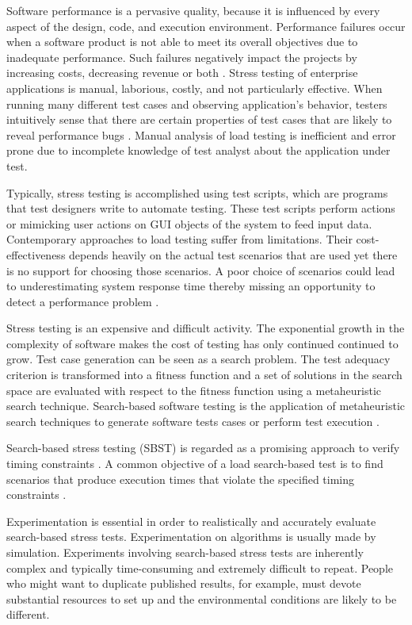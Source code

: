 \documentclass[espaco=umemeio,chapter=TITLE,twoside,openright]{abnt}
\begin{document}
Software performance is a pervasive quality,  because it is influenced by every aspect of the design, code, and execution environment. Performance failures occur when a software product is not able to meet its overall objectives due to inadequate performance. Such failures negatively impact the projects by increasing costs, decreasing revenue or both \cite{Vetoio2011}. Stress testing of enterprise applications is manual, laborious, costly, and not particularly effective. When running many different test cases and observing application’s behavior, testers intuitively sense that there are certain properties of test cases that are likely to reveal performance bugs \cite{Grechanik2012}. Manual analysis of load testing is inefficient and error prone due to incomplete knowledge of test analyst about the application under test\cite{Arslan2015}.

Typically, stress testing is accomplished using test scripts, which are programs that test designers write to automate testing. These test scripts perform actions or mimicking user actions on GUI objects of the system to feed input data. Contemporary approaches to load testing suffer from limitations. Their cost-effectiveness depends heavily on the actual test scenarios that are used yet there is no support for choosing those scenarios. A poor choice of scenarios could lead to underestimating system response time thereby missing an opportunity to detect a performance problem \cite{Grechanik2012}.


Stress testing is an expensive and difficult activity. The exponential
growth in the complexity of software makes the cost of testing has only continued continued to grow. Test case generation can be seen as a search problem. The test adequacy criterion is transformed into a fitness function and a set of solutions in the search
space are evaluated with respect to the fitness function using a metaheuristic search technique. Search-based software testing is the application of metaheuristic search techniques to generate software
tests cases or perform test execution \cite{Afzal2009a}.

Search-based stress testing (SBST) is regarded as a promising approach to verify timing constraints \cite{Afzal2009a}. A common objective of a load search-based test is to find  scenarios that produce execution times that violate the specified timing constraints \cite{Sullivan}. 

Experimentation is essential in order to realistically and accurately evaluate search-based stress tests. Experimentation on algorithms is usually made by simulation. Experiments involving search-based stress tests are inherently complex and typically time-consuming and extremely difficult to repeat. People who might want to duplicate published results, for example, must devote substantial resources to set up and the environmental conditions are likely to be different.
\end{document}
